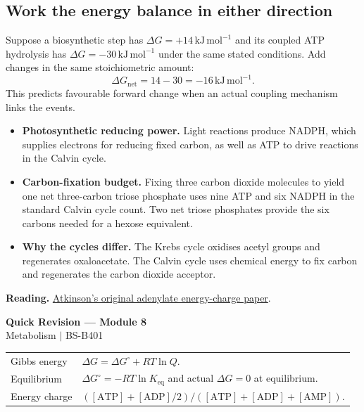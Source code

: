 \documentclass[12pt,a4paper]{article}
\renewcommand{\arraystretch}{1.45}
\begin{document}
\subsection{Work the energy balance in either direction}
\begin{tcolorbox}[examplebox, title={One uphill reaction coupled to ATP hydrolysis}]
Suppose a biosynthetic step has $\Delta G=+14\,\mathrm{kJ\,mol^{-1}}$ and its coupled ATP hydrolysis has $\Delta G=-30\,\mathrm{kJ\,mol^{-1}}$ under the same stated conditions. Add changes in the same stoichiometric amount:
\[
\Delta G_{\mathrm{net}}=14-30=-16\,\mathrm{kJ\,mol^{-1}}.
\]
This predicts favourable forward change when an actual coupling mechanism links the events.
\end{tcolorbox}

\begin{itemize}[leftmargin=*, itemsep=2pt]
  \item \textbf{Photosynthetic reducing power.} Light reactions produce NADPH, which supplies electrons for reducing fixed carbon, as well as ATP to drive reactions in the Calvin cycle.
  \item \textbf{Carbon-fixation budget.} Fixing three carbon dioxide molecules to yield one net three-carbon triose phosphate uses nine ATP and six NADPH in the standard Calvin cycle count. Two net triose phosphates provide the six carbons needed for a hexose equivalent.
  \item \textbf{Why the cycles differ.} The Krebs cycle oxidises acetyl groups and regenerates oxaloacetate. The Calvin cycle uses chemical energy to fix carbon and regenerates the carbon dioxide acceptor.
\end{itemize}

\textbf{Reading.} \href{https://pubmed.ncbi.nlm.nih.gov/4972613/}{Atkinson's original adenylate energy-charge paper}.

\newpage
\begin{center}
  {\large\bfseries\color{myred} Quick Revision --- Module 8}\\[3pt]
  {\small\color{mydark} Metabolism $|$ BS-B401}
\end{center}
\noindent{\color{myred}\rule{\linewidth}{1.2pt}}\par\vspace{4pt}

\begin{tcolorbox}[formulabox, title={Key Concepts at a Glance}]
\renewcommand{\arraystretch}{1.35}
\noindent\begin{tabularx}{\linewidth}{B{4.5cm}Y}
Gibbs energy & $\Delta G=\Delta G^\circ+RT\ln Q$. \\[3pt]
Equilibrium & $\Delta G^\circ=-RT\ln K_{\mathrm{eq}}$ and actual $\Delta G=0$ at equilibrium. \\[3pt]
Energy charge & $([\mathrm{ATP}]+[\mathrm{ADP}]/2)/([\mathrm{ATP}]+[\mathrm{ADP}]+[\mathrm{AMP}])$. \\[3pt]
\end{tabularx}\par
\end{tcolorbox}
\end{document}
